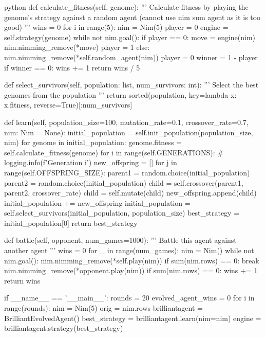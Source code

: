\begin{mintedbox}{python}
    def calculate_fitness(self, genome):
        '''
        Calculate fitness by playing the genome's strategy against a random agent
        (cannot use nim sum agent as it is too good)
        '''
        wins = 0
        for i in range(5):
            nim = Nim(5)
            player = 0
            engine = self.strategy(genome)
            while not nim.goal():
                if player == 0:
                    move = engine(nim)
                    nim.nimming_remove(*move)
                    player = 1
                else:
                    nim.nimming_remove(*self.random_agent(nim))
                    player = 0
            winner = 1 - player
            if winner == 0:
                wins += 1
        return wins / 5

    def select_survivors(self, population: list, num_survivors: int):
        '''
        Select the best genomes from the population
        '''
        return sorted(population, key=lambda x: x.fitness, reverse=True)[:num_survivors]

    def learn(self, population_size=100, mutation_rate=0.1, crossover_rate=0.7, nim: Nim = None):
        initial_population = self.init_population(population_size, nim)
        for genome in initial_population:
            genome.fitness = self.calculate_fitness(genome)
        for i in range(self.GENERATIONS):
            # logging.info(f'Generation {i}')
            new_offspring = []
            for j in range(self.OFFSPRING_SIZE):
                parent1 = random.choice(initial_population)
                parent2 = random.choice(initial_population)
                child = self.crossover(parent1, parent2, crossover_rate)
                child = self.mutate(child)
                new_offspring.append(child)
            initial_population += new_offspring
            initial_population = self.select_survivors(initial_population, population_size)
        best_strategy = initial_population[0]
        return best_strategy

    def battle(self, opponent, num_games=1000):
        '''
        Battle this agent against another agent
        '''
        wins = 0
        for _ in range(num_games):
            nim = Nim()
            while not nim.goal():
                nim.nimming_remove(*self.play(nim))
                if sum(nim.rows) == 0:
                    break
                nim.nimming_remove(*opponent.play(nim))
            if sum(nim.rows) == 0:
                wins += 1
        return wins

if __name__ == '__main__':
    rounds = 20
    evolved_agent_wins = 0
    for i in range(rounds):
        nim = Nim(5)
        orig = nim.rows
        brilliantagent = BrilliantEvolvedAgent()
        best_strategy = brilliantagent.learn(nim=nim)
        engine = brilliantagent.strategy(best_strategy)


\end{mintedbox}
